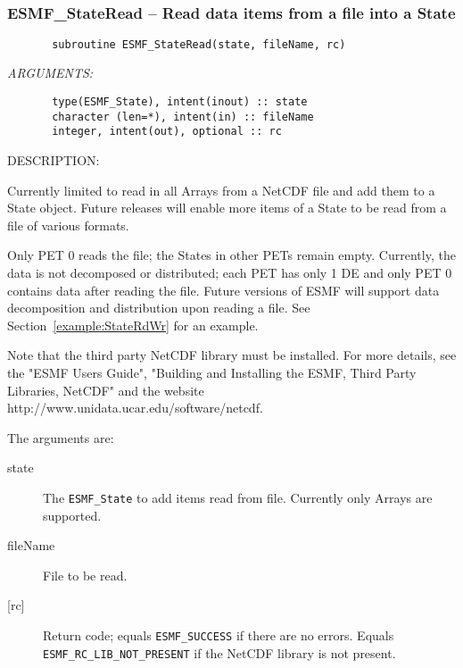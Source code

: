  
\mbox{}\hrulefill\ 
 
\subsubsection [ESMF\_StateRead] {ESMF\_StateRead -- Read data items from a file into a State}


  
\begin{verbatim}       subroutine ESMF_StateRead(state, fileName, rc)\end{verbatim}{\em ARGUMENTS:}
\begin{verbatim}       type(ESMF_State), intent(inout) :: state
       character (len=*), intent(in) :: fileName
       integer, intent(out), optional :: rc\end{verbatim}
{\sf DESCRIPTION:\\ }


   Currently limited to read in all Arrays from a NetCDF file and add them
   to a State object. Future releases will enable more items of a State
   to be read from a file of various formats.
  
   Only PET 0 reads the file; the States in other PETs remain empty.
   Currently, the data is not decomposed or distributed; each PET
   has only 1 DE and only PET 0 contains data after reading the file.
   Future versions of ESMF will support data decomposition and distribution
   upon reading a file. See Section~\ref{example:StateRdWr} for
   an example.
  
   Note that the third party NetCDF library must be installed. For more
   details, see the "ESMF Users Guide",
   "Building and Installing the ESMF, Third Party Libraries, NetCDF" and
   the website http://www.unidata.ucar.edu/software/netcdf.
  
   The arguments are:
   \begin{description}
   \item[state]
   The {\tt ESMF\_State} to add items read from file. Currently only
   Arrays are supported.
   \item[fileName]
   File to be read.
   \item[{[rc]}]
   Return code; equals {\tt ESMF\_SUCCESS} if there are no errors.
   Equals {\tt ESMF\_RC\_LIB\_NOT\_PRESENT} if the NetCDF library is
   not present.
   \end{description}
  
\setlength{\parskip}{\oldparskip}
\setlength{\parindent}{\oldparindent}
\setlength{\baselineskip}{\oldbaselineskip}
